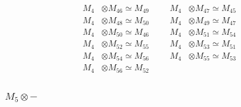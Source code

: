 \begin{align*}
M_{4} &\otimes M_{46} \simeq M_{49} &&& M_{4} &\otimes M_{47} \simeq M_{45}\\
M_{4} &\otimes M_{48} \simeq M_{50} &&& M_{4} &\otimes M_{49} \simeq M_{47}\\
M_{4} &\otimes M_{50} \simeq M_{46} &&& M_{4} &\otimes M_{51} \simeq M_{54}\\
M_{4} &\otimes M_{52} \simeq M_{55} &&& M_{4} &\otimes M_{53} \simeq M_{51}\\
M_{4} &\otimes M_{54} \simeq M_{56} &&& M_{4} &\otimes M_{55} \simeq M_{53}\\
M_{4} &\otimes M_{56} \simeq M_{52}
\end{align*}

\subsubsection{$ M_{5}\otimes -$}
